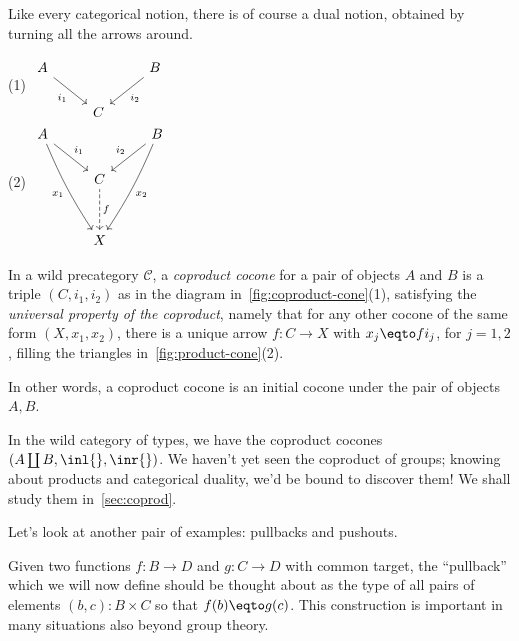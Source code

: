 Like every categorical notion, there is of course a dual notion,
obtained by turning all the arrows around.
\begin{marginfigure}
  \footnotesize\raggedright(1)
  $\begin{tikzcd}
    A & & B \\
    & C \ar[<-,ul,"i_1"]\ar[<-,ur,"i_2"'] &
  \end{tikzcd}$\\
  (2)
  $\begin{tikzcd}
    A & & B \\
    & C \ar[<-,ul,"i_1"']\ar[<-,ur,"i_2"] & \\[4mm]
    & X \ar[<-,uul,"x_1",bend left=5]\ar[<-,uur,"x_2"',bend right=5]
    \ar[<-,u,dashed,"f"'] &
  \end{tikzcd}$
  \caption{(1) A coproduct cocone, and (2) its universal property.}
  \label{fig:coproduct-cone}
\end{marginfigure}
\begin{definition}\label{def:coprod-in-a-cat}
  In a wild precategory $\mathcal C$, a \emph{coproduct cocone}
  for a pair of objects $A$ and $B$ is a triple $(C,i_1,i_2)$
  as in the diagram in~\cref{fig:coproduct-cone}(1),
  satisfying the \emph{universal property of the coproduct},
  namely that for any other cocone of the same form $(X,x_1,x_2)$,
  there is a unique arrow $f : C \to X$ with $x_j \eqto fi_j$, for $j=1,2$,
  \ie filling the triangles in~\cref{fig:product-cone}(2).
\end{definition}
In other words, a coproduct cocone is an initial cocone
under the pair of objects $A,B$.

In the wild category of types, we have the coproduct cocones $(A \coprod B, \inl{}, \inr{})$. We haven't yet seen the coproduct of groups;
knowing about products and categorical duality, we'd be bound to discover
them! We shall study them in~\cref{sec:coprod}.

Let's look at another pair of examples: pullbacks and pushouts.


Given two functions $f:B\to D$ and $g:C\to D$ with common target,
the ``pullback'' which we will now define should be thought about as the type of all pairs of elements $(b,c):B\times C$ so that $f(b)\eqto g(c)$.
This construction is important in many situations also beyond group theory.

